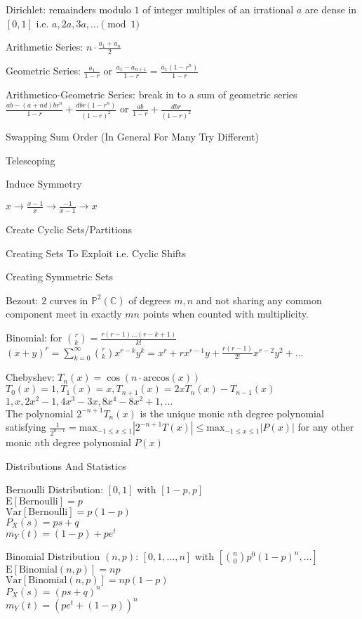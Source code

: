 Dirichlet: remainders modulo $1$ of integer multiples of an irrational $a$ are dense in $[0,1]$ i.e. $a,2a,3a,\dots \pmod{1}$

Arithmetic Series: $n \cdot \frac{a_1 + a_n}{2}$

Geometric Series: $\frac{a_1}{1-r}$ or $\frac{a_1 - a_{n+1}}{1-r}=\frac{a_1 (1-r^n)}{1-r}$

Arithmetico-Geometric Series: break in to a sum of geometric series $\frac{ab-(a+nd)br^n}{1-r}+\frac{dbr(1-r^n)}{(1-r)^2}$ or $\frac{ab}{1-r}+\frac{dbr}{(1-r)^2}$

Swapping Sum Order (In General For Many Try Different)

Telescoping

Induce Symmetry

$x \to \frac{x-1}{x} \to \frac{-1}{x-1} \to x$

Create Cyclic Sets/Partitions

Creating Sets To Exploit i.e. Cyclic Shifts

Creating Symmetric Sets

Bezout: $2$ curves in $\mathbb{P}^2(\mathbb{C})$ of degrees $m,n$ and not sharing any common component meet in exactly $mn$ points when counted with multiplicity.

Binomial: for $\binom{r}{k}=\frac{r(r-1)\dots (r-k+1)}{k!}$ \\
$(x+y)^r=\sum_{k=0}^{\infty}\binom{r}{k}x^{r-k}y^k=x^r+rx^{r-1}y+\frac{r(r-1)}{2!}x^{r-2}y^2+\dots$

Chebyshev: $T_n (x)=\cos(n\cdot \text{arccos}(x))$ \\
$T_0 (x)=1,T_1(x)=x,T_{n+1}(x)=2xT_n(x)-T_{n-1}(x)$ \\
$1,x,2x^2-1,4x^3-3x,8x^4-8x^2+1,\dots$ \\
The polynomial $2^{-n+1}T_n(x)$ is the unique monic $n$th degree polynomial satisfying $\frac{1}{2^{n-1}} = \text{max}_{-1 \le x \le 1}|2^{-n+1}T(x)| \le \text{max}_{-1 \le x \le 1}|P(x)|$ for any other monic $n$th degree polynomial $P(x)$

Distributions And Statistics

Bernoulli Distribution: $[0,1]$ with $[1-p,p]$ \\
$\text{E}[\text{Bernoulli}]=p$ \\
$\text{Var}[\text{Bernoulli}]=p(1-p)$ \\
$P_X(s)=ps+q$ \\
$m_Y(t)=(1-p)+pe^t$

Binomial Distribution $(n,p)$: $[0,1,\dots,n]$ with $[\binom{n}{0}p^0(1-p)^n,\dots]$ \\
$\text{E}[\text{Binomial}(n,p)]=np$ \\
$\text{Var}[\text{Binomial}(n,p)]=np(1-p)$ \\
$P_X(s)=(ps+q)^n$ \\
$m_Y(t)=(pe^t+(1-p))^n$

